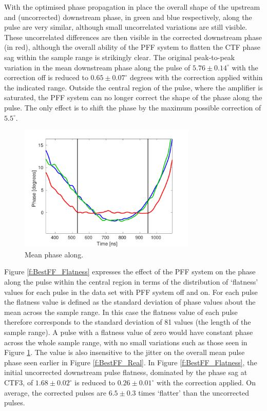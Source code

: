 With the optimised phase propagation in place the overall shape of the upstream and 
(uncorrected) downstream phase, in green and blue respectively, along the pulse are very 
similar, although small uncorrelated variations are still visible. These uncorrelated 
differences are then visible in the corrected downstream phase (in red), although the 
overall ability of the PFF system to flatten the CTF phase sag within the sample range 
is strikingly clear. The original peak-to-peak variation in the mean downstream phase 
along the pulse of \(5.76\pm0.14^\circ\) with the correction off is reduced to 
\(0.65\pm0.07^\circ\) degrees with the correction applied within the indicated range. 
Outside the central region of the pulse, where the amplifier is saturated, the PFF 
system can no longer correct the shape of the phase along the pulse. The only effect is 
to shift the phase by the maximum possible correction of \(5.5^\circ\).


\begin{figure}
  \centering
  \includegraphics[width=0.75\textwidth]{Figures/feedforward/BestFF_MeanPhaseAlong}
  \caption{Mean phase along.}
  \label{f:BestFF_MeanPhaseAlong}
\end{figure}

Figure \ref{f:BestFF_Flatness} expresses the effect of the PFF system on the phase along 
the pulse within the central region in terms of the distribution of `flatness' values 
for each pulse in the data set with PFF system off and on. For each pulse the flatness 
value is defined as the standard deviation of phase values about the mean across the 
sample range. In this case the flatness value of each pulse therefore corresponds to the standard deviation of 81 values (the length of the sample range). A pulse with a 
flatness value of zero would have constant phase across the whole sample range, with no 
small variations such as those seen in Figure \ref{f:BestFF_MeanPhaseAlong}. The value 
is also insensitive to the jitter on the overall mean pulse phase seen earlier in Figure \ref{f:BestFF_Real}. In Figure \ref{f:BestFF_Flatness}, the initial uncorrected 
downstream pulse flatness, dominated by the phase sag at CTF3, of \(1.68\pm0.02^\circ\) 
is reduced to \(0.26\pm0.01^\circ\) with the correction applied. On average, the 
corrected pulses are \(6.5\pm0.3\) times `flatter' than the uncorrected pulses.


